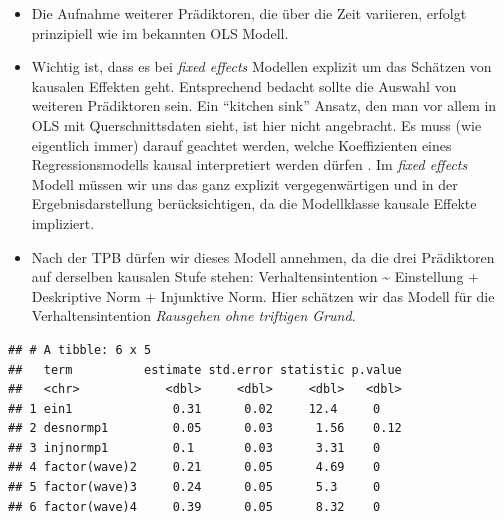 \documentclass[
]{book}
\newenvironment{Shaded}{\begin{snugshade}}{\end{snugshade}}
\newcommand{\DataTypeTok}[1]{\textcolor[rgb]{0.13,0.29,0.53}{#1}}
\newcommand{\DecValTok}[1]{\textcolor[rgb]{0.00,0.00,0.81}{#1}}
\newcommand{\KeywordTok}[1]{\textcolor[rgb]{0.13,0.29,0.53}{\textbf{#1}}}
\newcommand{\NormalTok}[1]{#1}
\newcommand{\OperatorTok}[1]{\textcolor[rgb]{0.81,0.36,0.00}{\textbf{#1}}}
\newcommand{\StringTok}[1]{\textcolor[rgb]{0.31,0.60,0.02}{#1}}
\begin{document}
\begin{itemize}
\item
  Die Aufnahme weiterer Prädiktoren, die über die Zeit variieren, erfolgt prinzipiell wie im bekannten OLS Modell.
\item
  Wichtig ist, dass es bei \emph{fixed effects} Modellen explizit um das Schätzen von kausalen Effekten geht. Entsprechend bedacht sollte die Auswahl von weiteren Prädiktoren sein. Ein ``kitchen sink'' Ansatz, den man vor allem in OLS mit Querschnittsdaten sieht, ist hier nicht angebracht. Es muss (wie eigentlich immer) darauf geachtet werden, welche Koeffizienten eines Regressionsmodells kausal interpretiert werden dürfen \citep{keeleCausalInterpretationEstimated2019}. Im \emph{fixed effects} Modell müssen wir uns das ganz explizit vergegenwärtigen und in der Ergebnisdarstellung berücksichtigen, da die Modellklasse kausale Effekte impliziert.
\item
  Nach der TPB dürfen wir dieses Modell annehmen, da die drei Prädiktoren auf derselben kausalen Stufe stehen: Verhaltensintention \textasciitilde{} Einstellung + Deskriptive Norm + Injunktive Norm. Hier schätzen wir das Modell für die Verhaltensintention \emph{Rausgehen ohne triftigen Grund}.
\end{itemize}

\begin{Shaded}
\end{Shaded}

\begin{verbatim}
## # A tibble: 6 x 5
##   term          estimate std.error statistic p.value
##   <chr>            <dbl>     <dbl>     <dbl>   <dbl>
## 1 ein1              0.31      0.02     12.4     0   
## 2 desnormp1         0.05      0.03      1.56    0.12
## 3 injnormp1         0.1       0.03      3.31    0   
## 4 factor(wave)2     0.21      0.05      4.69    0   
## 5 factor(wave)3     0.24      0.05      5.3     0   
## 6 factor(wave)4     0.39      0.05      8.32    0
\end{verbatim}
\end{document}
